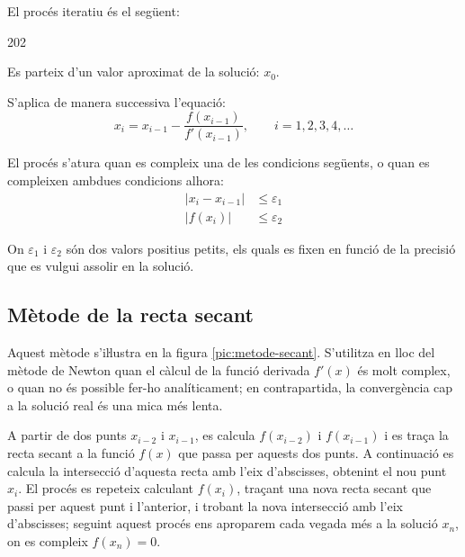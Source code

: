 El procés iteratiu és el següent:

\begin{dingautolist}{202}
    \item Es parteix d'un valor aproximat de la solució: $x_0$.

    \item   S'aplica de manera successiva l'equació:
            \begin{equation}\label{eq:newton}
              x_i = x_{i-1} - \frac{f(x_{i-1})}{f'(x_{i-1})}, \qquad i=1,2,3,4, \dots
            \end{equation}

    \item   El procés s'atura quan es compleix una de les condicions següents, o quan es compleixen ambdues condicions alhora:
            \begin{subequations}\begin{align}
              |x_i - x_{i-1}| &\leq \varepsilon_1 \\
              |f(x_i)| &\leq \varepsilon_2
            \end{align}\end{subequations}

            On $\varepsilon_1$ i $\varepsilon_2$ són dos valors positius petits, els quals es fixen en funció de la precisió que es vulgui assolir en la solució.
\end{dingautolist}



\subsection{Mètode de la recta secant}

Aquest mètode s'iŀlustra en la figura \vref{pic:metode-secant}. S'utilitza en lloc del mètode de Newton quan el càlcul de  la funció derivada $f'(x)$ és molt complex, o quan no és possible fer-ho analíticament; en contrapartida, la convergència cap a la solució real és una
mica més lenta.

A partir de dos punts $x_{i-2}$ i $x_{i-1}$, es calcula $f(x_{i-2})$ i $f(x_{i-1})$ i es traça la recta secant a la funció $f(x)$ que passa per aquests dos punts. A continuació es calcula la intersecció d'aquesta recta amb l'eix d'abscisses, obtenint el nou punt $x_i$. El procés es repeteix calculant $f(x_i)$, traçant una nova recta secant que passi per aquest punt i l'anterior, i trobant la nova intersecció amb l'eix d'abscisses; seguint aquest procés ens aproparem cada vegada més a la solució $x_n$, on es compleix $f(x_n)=0$.


